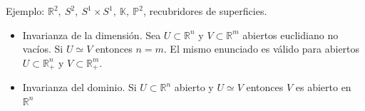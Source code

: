 \documentclass{article}
\begin{document}
Ejemplo: $\mathbb{R}^2,\:S^2,\:S^1\times S^1,\:\mathbb{K},\:\mathbb{P}^2$, recubridores de superficies.

\begin{itemize}
\item Invarianza de la  dimensión. Sea $U\subset \mathbb{R}^n$ y $V\subset \mathbb{R}^m$ abiertos euclidiano no vacíos. Si $U\simeq V$ entonces $n=m$. El mismo enunciado es válido para abiertos $U\subset \mathbb{R}^n_+$ y $V\subset \mathbb{R}^m_+$.

\item Invarianza del dominio. Si $U\subset \mathbb{R}^n$ abierto y $U\simeq V$ entonces $V$ es abierto en $\mathbb{R}^n$
\end{itemize}
\end{document}
